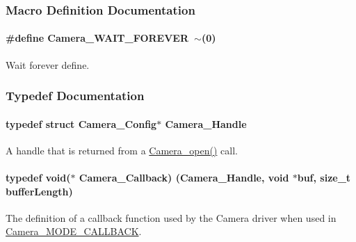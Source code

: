 \subsubsection{Macro Definition Documentation}
\paragraph[{Camera\+\_\+\+W\+A\+I\+T\+\_\+\+F\+O\+R\+E\+V\+E\+R}]{\setlength{\rightskip}{0pt plus 5cm}\#define Camera\+\_\+\+W\+A\+I\+T\+\_\+\+F\+O\+R\+E\+V\+E\+R~$\sim$(0)}\label{_camera_8h_a1b85e579e68cecb09d1e2be70a6c56a9}


Wait forever define. 



\subsubsection{Typedef Documentation}
\paragraph[{Camera\+\_\+\+Handle}]{\setlength{\rightskip}{0pt plus 5cm}typedef struct {\bf Camera\+\_\+\+Config}$\ast$ {\bf Camera\+\_\+\+Handle}}\label{_camera_8h_a68ce39c29bb7acaf6a7180bb6d6a7d06}


A handle that is returned from a \hyperlink{_camera_8h_a5bd1f515c97e0f598ff554c663bc6cde}{Camera\+\_\+open()} call. 

\paragraph[{Camera\+\_\+\+Callback}]{\setlength{\rightskip}{0pt plus 5cm}typedef void($\ast$ Camera\+\_\+\+Callback) ({\bf Camera\+\_\+\+Handle}, void $\ast$buf, size\+\_\+t buffer\+Length)}\label{_camera_8h_ad70b3ced1706386d1a093a0bf659bd87}


The definition of a callback function used by the Camera driver when used in \hyperlink{_camera_8h_a74c8a8a13eebddea16c33c726d096ba8ae2f15a1a358226aa81d59509f5a31191}{Camera\+\_\+\+M\+O\+D\+E\+\_\+\+C\+A\+L\+L\+B\+A\+C\+K}. 


